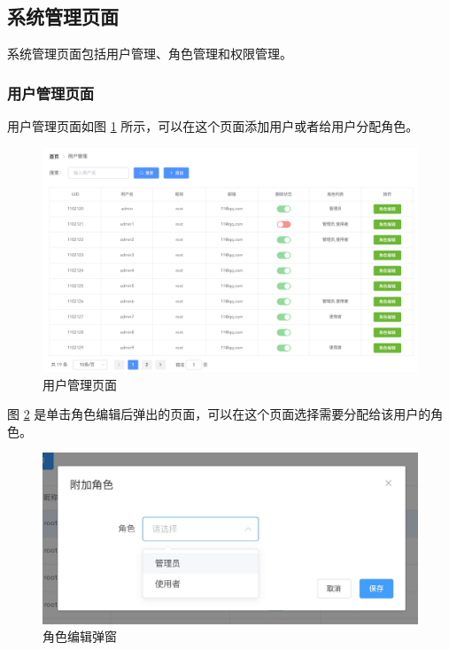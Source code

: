 \newpage
\subsection{系统管理页面}
系统管理页面包括用户管理、角色管理和权限管理。

\subsubsection{用户管理页面}
用户管理页面如图 \ref{Fig:user} 所示，可以在这个页面添加用户或者给用户分配角色。

\begin{figure}[ht]
    \centering
    \includegraphics[width=1\linewidth]{./Figure/IMG_user.png}
    \caption{用户管理页面}\label{Fig:user}
\end{figure}

图 \ref{Fig:add_role} 是单击角色编辑后弹出的页面，可以在这个页面选择需要分配给该用户的角色。

\begin{figure}[ht]
    \centering
    \includegraphics[width=1\linewidth]{./Figure/IMG_add_role.png}
    \caption{角色编辑弹窗}\label{Fig:add_role}
\end{figure}

